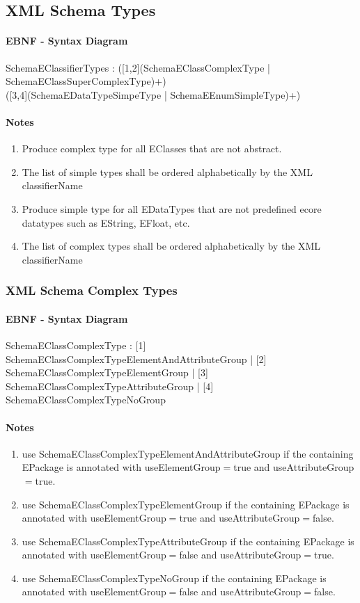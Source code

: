 \documentclass[11pt,a4paper]{article}
\begin{document}
\subsection{XML Schema Types}
\paragraph{EBNF - Syntax Diagram}
\begin{rail}
SchemaEClassifierTypes : 
([1,2](SchemaEClassComplexType
  | SchemaEClassSuperComplexType)+) \\
([3,4](SchemaEDataTypeSimpeType
  | SchemaEEnumSimpleType)+)
\end{rail}
\paragraph{Notes}
\begin{enumerate}
\item Produce complex type for all EClasses that are not abstract.
\item The list of simple types shall be ordered alphabetically by the XML classifierName
\item Produce simple type for all EDataTypes that are not predefined ecore datatypes such as EString, EFloat, etc.
\item The list of complex types shall be ordered alphabetically by the XML classifierName
\end{enumerate}

\subsubsection{XML Schema Complex Types}
\paragraph{EBNF - Syntax Diagram}
\begin{rail}
SchemaEClassComplexType : 
  [1] SchemaEClassComplexTypeElementAndAttributeGroup
  | [2] SchemaEClassComplexTypeElementGroup
  | [3] SchemaEClassComplexTypeAttributeGroup
  | [4] SchemaEClassComplexTypeNoGroup
\end{rail}

\paragraph{Notes}
\begin{enumerate}
\item use SchemaEClassComplexTypeElementAndAttributeGroup if the containing EPackage is annotated with useElementGroup$=$true and useAttributeGroup$=$true.
\item use SchemaEClassComplexTypeElementGroup if the containing EPackage is annotated with useElementGroup$=$true and useAttributeGroup$=$false.
\item use SchemaEClassComplexTypeAttributeGroup if the containing EPackage is annotated with useElementGroup$=$false and useAttributeGroup$=$true.
\item use SchemaEClassComplexTypeNoGroup if the containing EPackage is annotated with useElementGroup$=$false and useAttributeGroup$=$false.
\end{enumerate}
\end{document}
